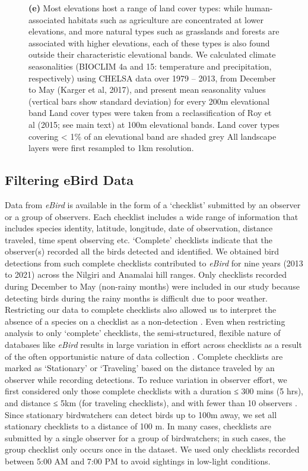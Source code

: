 \begin{figure}[h!]
{        \textbf{(e)} Most elevations host a range of land cover types: while human-associated habitats such as agriculture are concentrated at lower elevations, and more natural types such as grasslands and forests are associated with higher elevations, each of these types is also found outside their characteristic elevational bands.
        We calculated climate seasonalities (BIOCLIM 4a and 15: temperature and precipitation, respectively) using CHELSA data over 1979 -- 2013, from December to May (Karger et al, 2017), and present mean seasonality values (vertical bars show standard deviation) for every 200m elevational band
        Land cover types were taken from a reclassification of Roy et al
        (2015; see main text) at 100m elevational bands.
        Land cover types covering < 1\% of an elevational band are shaded grey
        All landscape layers were first resampled to 1km resolution.
    }
    \label{hilly_fig_02}
\end{figure}

\subsection*{Filtering eBird Data}

Data from \textit{eBird} is available in the form of a `checklist' submitted by an observer or a group of observers.
Each checklist includes a wide range of information that includes species identity, latitude, longitude, date of observation, distance traveled, time spent observing etc.
`Complete' checklists indicate that the observer(s) recorded all the birds detected and identified.
We obtained bird detections from such complete checklists contributed to \textit{eBird} for nine years (2013 to 2021) across the Nilgiri and Anamalai hill ranges.
Only checklists recorded during December to May (non-rainy months) were included in our study because detecting birds during the rainy months is difficult due to poor weather.
Restricting our data to complete checklists also allowed us to interpret the absence of a species on a checklist as a non-detection \citep[called zero-filling][]{johnston2021}.
Even when restricting analysis to only `complete' checklists, the semi-structured, flexible nature of databases like \textit{eBird} results in large variation in effort across checklists as a result of the often opportunistic nature of data collection \citep{kelling2019}.
Complete checklists are marked as `Stationary' or `Traveling' based on the distance traveled by an observer while recording detections.
To reduce variation in observer effort, we first considered only those complete checklists with a duration ≤ 300 mins (5 hrs), and distance ≤ 5km (for traveling checklists), and with fewer than 10 observers \citep[following][]{johnston2019}.
Since stationary birdwatchers can detect birds up to 100m away, we set all stationary checklists to a distance of 100 m.
In many cases, checklists are submitted by a single observer for a group of birdwatchers; in such cases, the group checklist only occurs once in the dataset.
We used only checklists recorded between 5:00 AM and 7:00 PM to avoid sightings in low-light conditions.

